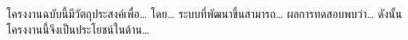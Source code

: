 %

โครงงานฉบับนี้มีวัตถุประสงค์เพื่อ\ldots{} โดย\ldots{} ระบบที่พัฒนาขึ้นสามารถ\ldots{} ผลการทดสอบพบว่า\ldots{} ดังนั้น โครงงานนี้จึงเป็นประโยชน์ในด้าน\ldots{}
